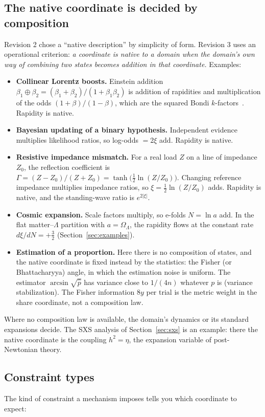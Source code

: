 \documentclass[11pt]{article}
\theoremstyle{definition}
\theoremstyle{remark}
\begin{document}
\subsection{The native coordinate is decided by composition}
Revision 2 chose a ``native description'' by simplicity of form. Revision 3 uses an
operational criterion: \emph{a coordinate is native to a domain when the domain's own way of
combining two states becomes addition in that coordinate.} Examples:
\begin{itemize}
\item \textbf{Collinear Lorentz boosts.} Einstein addition
$\beta_1\oplus\beta_2=(\beta_1+\beta_2)/(1+\beta_1\beta_2)$ is addition of rapidities and
multiplication of the odds $(1+\beta)/(1-\beta)$, which are the squared Bondi
$k$-factors~\cite{Bondi1964,Varicak1910,DeJesus2026SR}. Rapidity is native.
\item \textbf{Bayesian updating of a binary hypothesis.} Independent evidence multiplies
likelihood ratios, so log-odds $=2\xi$ add. Rapidity is native.
\item \textbf{Resistive impedance mismatch.} For a real load $Z$ on a line of impedance
$Z_0$, the reflection coefficient is $\Gamma=(Z-Z_0)/(Z+Z_0)=\tanh\!\big(\tfrac12\ln(Z/Z_0)\big)$.
Changing reference impedance multiplies impedance ratios, so $\xi=\tfrac12\ln(Z/Z_0)$ adds.
Rapidity is native, and the standing-wave ratio is $e^{2|\xi|}$.
\item \textbf{Cosmic expansion.} Scale factors multiply, so e-folds $N=\ln a$ add. In the
flat matter--$\Lambda$ partition with $a=\Omega_\Lambda$, the rapidity flows at the
constant rate $d\xi/dN=+\tfrac32$ (Section~\ref{sec:examples}).
\item \textbf{Estimation of a proportion.} Here there is no composition of states, and the
native coordinate is fixed instead by the statistics: the Fisher (or Bhattacharyya) angle,
in which the estimation noise is uniform. The estimator $\arcsin\sqrt{\hat p}$ has variance
close to $1/(4n)$ whatever $p$ is (variance stabilization). The Fisher information $8y$ per
trial is the metric weight in the share coordinate, not a composition law.
\end{itemize}
Where no composition law is available, the domain's dynamics or its standard expansions
decide. The SXS analysis of Section~\ref{sec:sxs} is an example: there the native coordinate
is the coupling $h^2=\eta$, the expansion variable of post-Newtonian theory.

\subsection{Constraint types}
The kind of constraint a mechanism imposes tells you which coordinate to expect:
\end{document}
